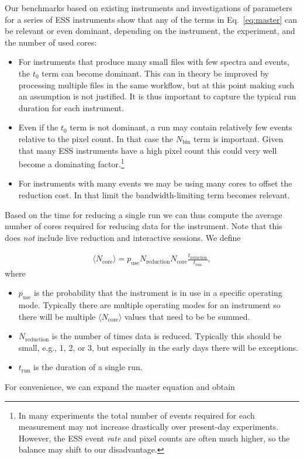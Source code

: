 \documentclass[a4paper,english,numbers=noenddot,bibliography=totoc,chapterprefix=on,DIV=12]{scrartcl}
\newcommand{\Treduction}{t_{\text{reduction}}}
\newcommand{\Trun}{t_{\text{run}}}
\newcommand{\Nbin}{N_{\text{bin}}}
\newcommand{\Ncore}{N_{\text{core}}}
\newcommand{\Ncoremean}{\langle N_{\text{core}}\rangle}
\newcommand{\Nreduction}{N_{\text{reduction}}}
\begin{document}
Our benchmarks based on existing instruments and investigations of parameters for a series of ESS instruments show that any of the terms in Eq.~\eqref{eq:master} can be relevant or even dominant, depending on the instrument, the experiment, and the number of used cores:

\begin{itemize}
  \item 
    For instruments that produce many small files with few spectra and events, the $t_0$ term can become dominant.
    This can in theory be improved by processing multiple files in the same workflow, but at this point making such an assumption is not justified.
    It is thus important to capture the typical run duration for each instrument.
  \item
    Even if the $t_0$ term is not dominant, a run may contain relatively few events relative to the pixel count.
    In that case the $\Nbin$ term is important.
    Given that many ESS instruments have a high pixel count this could very well become a dominating factor.\footnote{In many experiments the total number of events required for each measurement may not increase drastically over present-day experiments. However, the ESS event \emph{rate} and pixel counts are often much higher, so the balance may shift to our disadvantage.}
  \item
    For instruments with many events we may be using many cores to offset the reduction cost.
    In that limit the bandwidth-limiting term becomes relevant.
\end{itemize}

Based on the time for reducing a single run we can thus compute the average number of cores required for reducing data for the instrument.
Note that this does \emph{not} include live reduction and interactive sessions.
We define

\begin{align}
  \Ncoremean = p_{\text{use}}\Nreduction \Ncore \frac{\Treduction}{\Trun},
\end{align}
where

\begin{itemize}
  \item $p_{\text{use}}$ is the probability that the instrument is in use in a specific operating mode.
  Typically there are multiple operating modes for an instrument so there will be multiple $\Ncoremean$ values that need to be be summed.
  \item $\Nreduction$ is the number of times data is reduced.
    Typically this should be small, e.g., 1, 2, or 3, but especially in the early days there will be exceptions.
  \item $\Trun$ is the duration of a single run.
\end{itemize}
For convenience, we can expand the master equation and obtain
\end{document}
